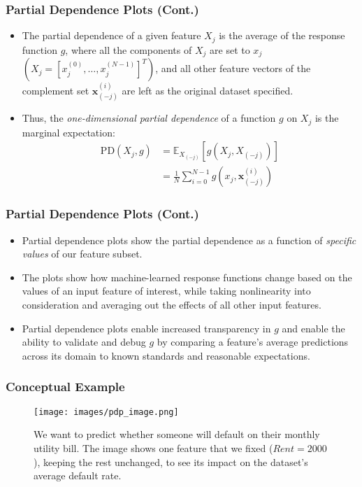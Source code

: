 \begin{frame}\frametitle{Partial Dependence Plots (Cont.)}
	\begin{itemize}
	\item The partial dependence of a given feature $X_j$ is the average of the response function $g$, where all the components of $X_j$ are set to $x_j$ $(X_j= [x_j^{(0)}, \dots, x_j^{(N-1)}]^T)$, and all other feature vectors of the complement set $\mathbf{x}_{(-j)}^{(i)}$ are left as the original dataset specified.
	\item Thus, the \textit{one-dimensional partial dependence} of a function $g$ on  $X_j$ is the marginal expectation:
			\begin{equation}\label{eq:pd1}
			\begin{aligned}
				\text{PD}(X_j, g) &= \mathbb{E}_{X_{(-j)}}\left[g(X_j, X_{(-j)})\right]\\
			&= \frac{1}{N}\sum_{i = 0}^{N-1}g(x_j, \mathbf{x}_{(-j)}^{(i)})
		\end{aligned}
		\end{equation}
	\end{itemize}
\end{frame}



\begin{frame}\frametitle{Partial Dependence Plots (Cont.)}		
	\begin{itemize}
		\item Partial dependence plots show the partial dependence as a function of \textit{specific values} of our feature subset.
		\item The plots show how machine-learned response functions change based on the values of an input feature of interest, while taking nonlinearity into consideration and averaging out the effects of all other input features.
		\item Partial dependence plots enable increased transparency in $g$ and enable the ability to validate and debug $g$ by comparing a feature's average predictions across its domain to known standards and reasonable expectations. 
	\end{itemize}
\end{frame}


\begin{frame}
\frametitle{Conceptual Example}
\begin{figure}
\texttt{[image: images/pdp\_image.png]}
\caption{We want to predict whether someone will default on their monthly utility bill. The image shows one feature that we fixed ($Rent=2000$), keeping the rest unchanged, to see its impact on the dataset's average default rate.}
\end{figure}
\end{frame}